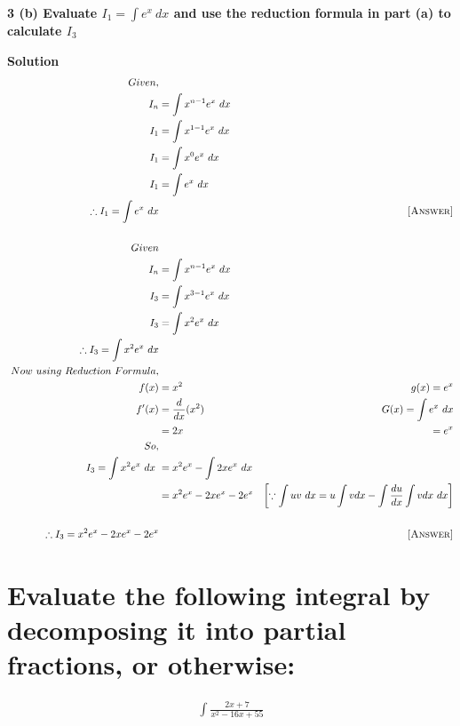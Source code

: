 \documentclass[12pt]{article}
\begin{document}
\textbf{3 (b) Evaluate $I_1 = \int{e^x}\ dx$ and use the reduction formula in part (a) to calculate $I_3$ }


\textbf{Solution}
\begin{align*}
    Given,\\ I_n&=\int {x^{n-1}}{e^x}\ dx\\
    I_1&=\int {x^{1-1}}{e^x}\ dx\\
    I_1&=\int {x^0}{e^x}\ dx\\
    I_1&=\int{e^x}\ dx\\
    \therefore I_1=\int e^x\ dx
     & & \textsc{[Answer]}\\\\
     Given\\ I_n&=\int {x^{n-1}}{e^x}\ dx\\
     I_3&=\int {x^{3-1}}{e^x}\ dx\\
    I_3&=\int {x^2}{e^x}\ dx\\
    \therefore I_3=\int{x^2} e^x\ dx\\\
    Now\ using\ Reduction\ Formula,\\
    f(x)&=x^2      &   g(x)=e^{x}\\
    f{'}(x)&=\frac{d}{dx}(x^2)  & G(x)=\int{e^x}\ dx\\
    &=2x                    &   =e^x\\
    So,\\ 
    I_3=\int {x^2}{e^x}\ dx\
    &=x^2e^x-\int{2x}{e^x}\ dx\\
    &=x^2e^x-2xe^x-2e^x   & \left[\because \int {u}{v}\ dx=u\int {v}dx-\int {\frac{du}{dx}}\int {v}dx\ dx\right]\\\\
    \therefore I_3=x^2e^x-2xe^x-2e^x
    & & \textsc{[Answer]}
\end{align*}
\pagebreak

\section{Evaluate the following integral by decomposing it into partial fractions, or otherwise:}


\begin{align*}
    \int{\frac{2x+7}{x^2-16x+55}}
\end{align*}
\end{document}
